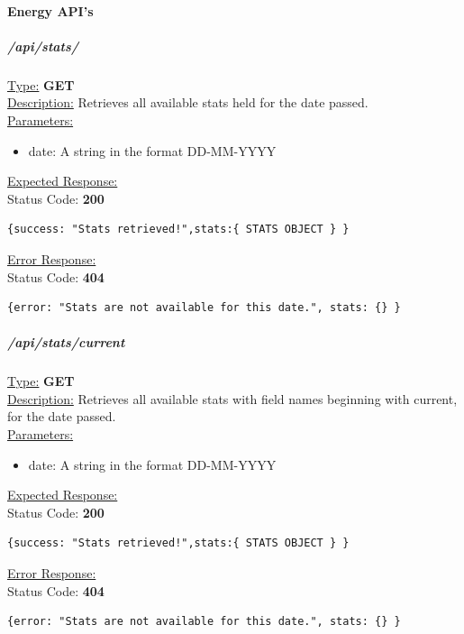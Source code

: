 \documentclass[draft,preprint,12pt,3p]{elsarticle}
\newcommand{\forceindent}{\leavevmode{\parindent=1em\indent}}
\begin{document}
\paragraph{Energy API's}
\subparagraph*{/api/stats/}
\underline{Type:} \textbf{GET}\\

\underline{Description:} Retrieves all available stats held for the date passed.\\

\underline{Parameters:}

\begin{itemize}
\item date: A string in the format DD-MM-YYYY
\end{itemize}

\underline{Expected Response:}\\[5pt]
\forceindent Status Code: \textbf{200} \\
\begin{verbatim}
{success: "Stats retrieved!",stats:{ STATS OBJECT } }
\end{verbatim}
\underline{Error Response:}\\[5pt]
\forceindent Status Code: \textbf{404} \\
\begin{verbatim}
{error: "Stats are not available for this date.", stats: {} }
\end{verbatim}

\subparagraph*{/api/stats/current}
\underline{Type:} \textbf{GET}\\

\underline{Description:} Retrieves all available stats with field names beginning with current, for the date passed.\\

\underline{Parameters:}

\begin{itemize}
\item date: A string in the format DD-MM-YYYY
\end{itemize}

\underline{Expected Response:}\\[5pt]
\forceindent Status Code: \textbf{200} \\
\begin{verbatim}
{success: "Stats retrieved!",stats:{ STATS OBJECT } }
\end{verbatim}
\underline{Error Response:}\\[5pt]
\forceindent Status Code: \textbf{404} \\
\begin{verbatim}
{error: "Stats are not available for this date.", stats: {} }
\end{verbatim}
\end{document}
